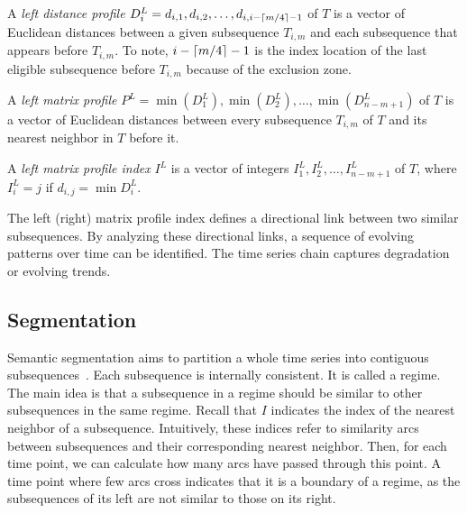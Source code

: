 \begin{definition}
    A \textit{left distance profile} $D_i^L = d_{i, 1}, d_{i, 2}, \dots,\allowbreak d_{i, i - \lceil m/4\rceil -1}$ of $T$ is a vector of Euclidean distances between a given subsequence $T_{i, m}$ and each subsequence that appears before $T_{i, m}$.
    To note, $i - \lceil m/4\rceil - 1$ is the index location of the last eligible subsequence before $T_{i, m}$ because of the exclusion zone.
\end{definition}

\begin{definition}
    A \textit{left matrix profile} $P^L = \min(D_1^L), \min(D_2^L), \allowbreak  \dots, \min(D_{n-m+1}^L)$ of $T$ is a vector of Euclidean distances between every subsequence $T_{i, m}$ of $T$ and its nearest neighbor in $T$ before it.
\end{definition}

\begin{definition}
    A \textit{left matrix profile index} $I^L$ is a vector of integers $I_1^L, I_2^L, \dots, I_{n-m+1}^L$ of $T$, where $I_i^L = j$ if $d_{i, j} = \min{D_i^L}$.
\end{definition}

The left (right) matrix profile index defines a directional link between two similar subsequences.
By analyzing these directional links, a sequence of evolving patterns over time can be identified. The time series chain captures degradation or evolving trends.

\subsection{Segmentation} %

Semantic segmentation aims to partition a whole time series into contiguous subsequences~\cite{yeh2018time}. Each subsequence is internally consistent. It is called a regime.
The main idea is that a subsequence in a regime should be similar to other subsequences in the same regime.
Recall that $I$ indicates the index of the nearest neighbor of a subsequence.
Intuitively, these indices refer to similarity arcs between subsequences and their corresponding nearest neighbor. Then, for each time point, we can calculate how many arcs have passed through this point.
A time point where few arcs cross indicates that it is a boundary of a regime, as the subsequences of its left are not similar to those on its right.

